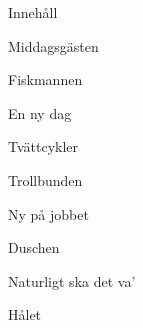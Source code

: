 
\page[right]
\start
\null\blank[3*line]
\centerline{\tfc Innehåll}
\blank[4*line]
\setupwhitespace[line]
\setupnarrower[middle=2cm]
\startnarrower[middle]
\tfa
Middagsgästen\hfill\at[middagsgästen]\par

Fiskmannen\hfill\at[fiskmannen]\par

En ny dag\hfill\at[ennydag]\par

Tvättcykler\hfill\at[tvättcykler]\par

Trollbunden\hfill\at[trollbunden]\par

Ny på jobbet\hfill\at[nypåjobbet]\par

Duschen\hfill\at[duschen]\par

Naturligt ska det va’\hfill\at[naturligtskadetva]\par

Hålet\hfill\at[hålet]\par

\stopnarrower
\stop

